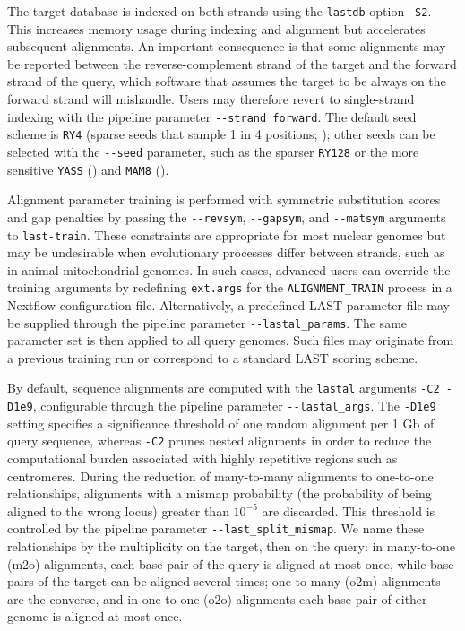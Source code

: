 \documentclass[PCJ,Unicode,screen]{cedram}
\begin{document}
The target database is indexed on both strands using the \texttt{lastdb} option \verb|-S2|. This increases memory usage during indexing and alignment but accelerates subsequent alignments. An important consequence is that some alignments may be reported between the reverse-complement strand of the target and the forward strand of the query, which software that assumes the target to be always on the forward strand will mishandle. Users may therefore revert to single-strand indexing with the pipeline parameter \verb|--strand forward|. The default seed scheme is \verb|RY4| (sparse seeds that sample 1 in 4 positions; \cite{Frith_2023}); other seeds can be selected with the \verb|--seed| parameter, such as the sparser \verb|RY128| or the more sensitive \verb|YASS| (\cite{Noé_2005}) and \verb|MAM8| (\cite{Frith_2014}).

Alignment parameter training is performed with symmetric substitution scores and gap penalties by passing the \verb|--revsym|, \verb|--gapsym|, and \verb|--matsym| arguments to \texttt{last-train}. These constraints are appropriate for most nuclear genomes but may be undesirable when evolutionary processes differ between strands, such as in animal mitochondrial genomes. In such cases, advanced users can override the training arguments by redefining \texttt{ext.args} for the \texttt{ALIGNMENT\_\allowbreak TRAIN} process in a Nextflow configuration file. Alternatively, a predefined LAST parameter file may be supplied through the pipeline parameter \verb|--lastal_params|. The same parameter set is then applied to all query genomes. Such files may originate from a previous training run or correspond to a standard LAST scoring scheme.

By default, sequence alignments are computed with the \texttt{lastal} arguments \verb|-C2 -D1e9|, configurable through the pipeline parameter \verb|--lastal_args|. The \verb|-D1e9| setting specifies a significance threshold of one random alignment per 1 Gb of query sequence, whereas \texttt{-C2} prunes nested alignments in order to reduce the computational burden associated with highly repetitive regions such as centromeres. During the reduction of many-to-many alignments to one-to-one relationships, alignments with a mismap probability (the probability of being aligned to the wrong locus) greater than $10^{-5}$ are discarded. This threshold is controlled by the pipeline parameter \verb|--last_split_mismap|. We name these relationships by the multiplicity on the target, then on the query: in many-to-one (m2o) alignments, each base-pair of the query is aligned at most once, while base-pairs of the target can be aligned several times; one-to-many (o2m) alignments are the converse, and in one-to-one (o2o) alignments each base-pair of either genome is aligned at most once.
\end{document}
